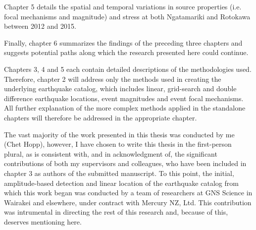 Chapter 5 details the spatial and temporal variations in source properties (i.e. focal mechanisms and magnitude) and stress at both Ngatamariki and Rotokawa between 2012 and 2015.

Finally, chapter 6 summarizes the findings of the preceding three chapters and suggests potential paths along which the research presented here could continue.

Chapters 3, 4 and 5 each contain detailed descriptions of the methodologies used. Therefore, chapter 2 will address only the methods used in creating the underlying earthquake catalog, which includes linear, grid-search and double difference earthquake locations, event magnitudes and event focal mechanisms. All further explanation of the more complex methods applied in the standalone chapters will therefore be addressed in the appropriate chapter.

The vast majority of the work presented in this thesis was conducted by me (Chet Hopp), however, I have chosen to write this thesis in the first-person plural, as is consistent with, and in acknowledgment of, the significant contributions of both my supervisors and colleagues, who have been included in chapter 3 as authors of the submitted manuscript. To this point, the initial, amplitude-based detection and linear location of the earthquake catalog from which this work began was conducted by a team of researchers at GNS Science in Wairakei and elsewhere, under contract with Mercury NZ, Ltd. This contribution was intrumental in directing the rest of this research and, because of this, deserves mentioning here.